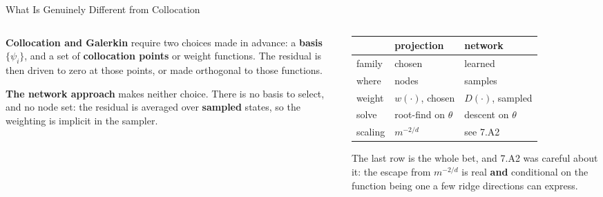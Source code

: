 \begin{frame}{What Is Genuinely Different from Collocation}
\begin{columns}[T]
\begin{column}{0.49\textwidth}
\small
\textbf{Collocation and Galerkin} require two choices made in advance: a \textbf{basis} $\{\psi_i\}$, and a set of \textbf{collocation points} or weight functions. The residual is then driven to zero at those points, or made orthogonal to those functions.
\medskip

\textbf{The network approach} makes neither choice. There is no basis to select, and no node set: the residual is averaged over \textbf{sampled} states, so the weighting is implicit in the sampler.
\end{column}
\begin{column}{0.48\textwidth}
\begin{center}\footnotesize
\begin{tabularx}{\linewidth}{@{}>{\raggedright\arraybackslash}p{1.5cm} >{\raggedright\arraybackslash}X >{\raggedright\arraybackslash}X@{}}
\toprule
& \textbf{projection} & \textbf{network} \\
\midrule
family & chosen & learned \\
where & nodes & samples \\
weight & $w(\cdot)$, chosen & $D(\cdot)$, sampled \\
solve & root-find on $\theta$ & descent on $\theta$ \\
scaling & $m^{-2/d}$ & see 7.A2 \\
\bottomrule
\end{tabularx}
\end{center}
\medskip
\begin{cautionbox}\footnotesize
The last row is the whole bet, and 7.A2 was careful about it: the escape from $m^{-2/d}$ is real \textbf{and} conditional on the function being one a few ridge directions can express.
\end{cautionbox}
\end{column}
\end{columns}
\end{frame}

